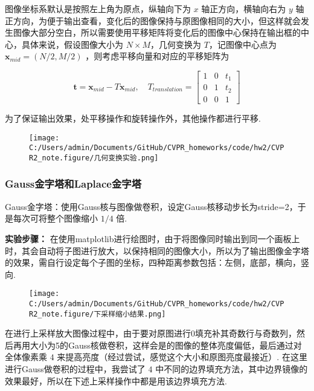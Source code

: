 \documentclass[
]{article}
\begin{document}
图像坐标系默认是按照左上角为原点，纵轴向下为 \(x\) 轴正方向，横轴向右为
\(y\)
轴正方向，为便于输出查看，变化后的图像保持与原图像相同的大小，但这样就会发生图像大部分空白，所以需要使用平移矩阵将变化后的图像中心保持在输出框的中心，具体来说，假设图像大小为
\(N\times M\)，几何变换为 \(T\)，记图像中心点为
\(\boldsymbol{x}_{mid} = (N/2,M/2)\) ，则考虑平移向量和对应的平移矩阵为

\[\boldsymbol{t} = \boldsymbol{x}_{mid} - T\boldsymbol{x}_{mid},\quad T_{translation}=\left[\begin{matrix}1&0&t_1\\ 0&1&t_2\\0&0&1\end{matrix}\right]\]

为了保证输出效果，处平移操作和旋转操作外，其他操作都进行平移.

\begin{figure}
\centering
\texttt{[image: C:/Users/admin/Documents/GitHub/CVPR\_homeworks/code/hw2/CVPR2\_note.figure/几何变换实验.png]}
\caption{}
\end{figure}

\hypertarget{gaussux91d1ux5b57ux5854ux548claplaceux91d1ux5b57ux5854}{%
\subsubsection{Gauss金字塔和Laplace金字塔}\label{gaussux91d1ux5b57ux5854ux548claplaceux91d1ux5b57ux5854}}

Gauss金字塔：使用Gauss核与图像做卷积，设定Gauss核移动步长为stride=2，于是每次可将整个图像缩小
\(1/4\) 倍.

\textbf{实验步骤：}
在使用matplotlib进行绘图时，由于将图像同时输出到同一个画板上时，其会自动将子图进行放大，以保持相同的图像大小，所以为了输出图像金字塔的效果，需自行设定每个子图的坐标，四种距离参数包括：左侧，底部，横向，竖向.

\begin{figure}
\centering
\texttt{[image: C:/Users/admin/Documents/GitHub/CVPR\_homeworks/code/hw2/CVPR2\_note.figure/下采样缩小结果.png]}
\caption{}
\end{figure}

在进行上采样放大图像过程中，由于要对原图进行0填充补其奇数行与奇数列，然后再用大小为5的Gauss核做卷积，这样会是的图像的整体亮度偏低，最后通过对全体像素乘
\(4\) 来提高亮度（经过尝试，感觉这个大小和原图亮度最接近）.
在这里进行Gauss做卷积的过程中，我尝试了 \(4\)
中不同的边界填充方法，其中边界镜像的效果最好，所以在下述上采样操作中都是用该边界填充方法.
\end{document}
